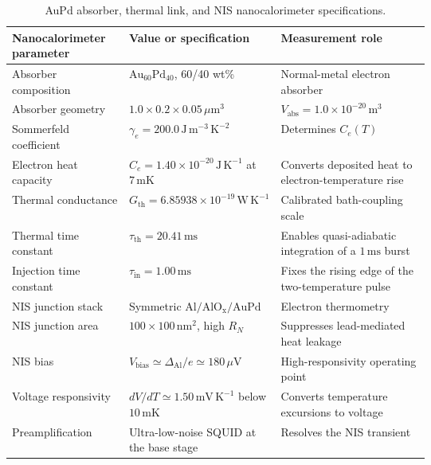\documentclass[11pt,letterpaper]{article}
\theoremstyle{plain}
\begin{document}
\begin{table}[H]
\centering
\small
\begin{tabularx}{\linewidth}{@{}L{0.29\linewidth}L{0.32\linewidth}Y@{}}
\toprule
Nanocalorimeter parameter & Value or specification & Measurement role \\
\midrule
Absorber composition & \(\mathrm{Au}_{60}\mathrm{Pd}_{40}\), 60/40 wt\% & Normal-metal electron absorber \\
Absorber geometry & \(1.0\times0.2\times0.05\,\mu\mathrm{m}^3\) & \(V_{\text{abs}}=1.0\times10^{-20}\,\mathrm{m^3}\) \\
Sommerfeld coefficient & \(\gamma_e=200.0\,\mathrm{J\,m^{-3}\,K^{-2}}\) & Determines \(C_e(T)\) \\
Electron heat capacity & \(C_e=1.40\times10^{-20}\,\mathrm{J\,K^{-1}}\) at \(7\,\mathrm{mK}\) & Converts deposited heat to electron-temperature rise \\
Thermal conductance & \(G_{\text{th}}=6.85938\times10^{-19}\,\mathrm{W\,K^{-1}}\) & Calibrated bath-coupling scale \\
Thermal time constant & \(\tau_{\text{th}}=20.41\,\mathrm{ms}\) & Enables quasi-adiabatic integration of a \(1\,\mathrm{ms}\) burst \\
Injection time constant & \(\tau_{\text{in}}=1.00\,\mathrm{ms}\) & Fixes the rising edge of the two-temperature pulse \\
NIS junction stack & Symmetric \(\mathrm{Al/AlO_x/AuPd}\) & Electron thermometry \\
NIS junction area & \(100\times100\,\mathrm{nm}^2\), high \(R_N\) & Suppresses lead-mediated heat leakage \\
NIS bias & \(V_{\text{bias}}\simeq\Delta_{\text{Al}}/e\simeq180\,\mu\mathrm{V}\) & High-responsivity operating point \\
Voltage responsivity & \(dV/dT\simeq1.50\,\mathrm{mV\,K^{-1}}\) below \(10\,\mathrm{mK}\) & Converts temperature excursions to voltage \\
Preamplification & Ultra-low-noise SQUID at the base stage & Resolves the NIS transient \\
\bottomrule
\end{tabularx}
\caption{AuPd absorber, thermal link, and NIS nanocalorimeter specifications.}
\label{tab:calorimetry-nanocalorimeter}
\end{table}
\end{document}
